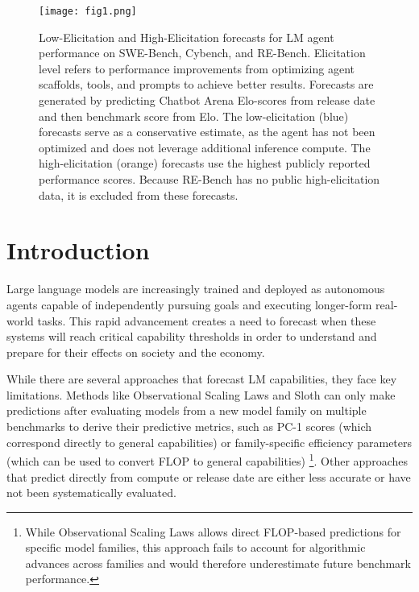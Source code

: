 \begin{figure*}
    \centering
    \texttt{[image: fig1.png]}
    \vskip -0.1in
    \caption{Low-Elicitation and High-Elicitation forecasts for LM agent performance on SWE-Bench, Cybench, and RE-Bench. Elicitation level refers to performance improvements from optimizing agent scaffolds, tools, and prompts to achieve better results. Forecasts are generated by predicting Chatbot Arena Elo-scores from release date and then benchmark score from Elo. The low-elicitation (blue) forecasts serve as a conservative estimate, as the agent has not been optimized and does not leverage additional inference compute. 
    The high-elicitation (orange) forecasts use the highest publicly reported performance scores. Because RE-Bench has no public high-elicitation data, it is excluded from these forecasts.
    } 
    \label{fig:scaling-graph}
\end{figure*}

\section{Introduction}
Large language models are increasingly trained and deployed as autonomous agents capable of independently pursuing goals and executing longer-form real-world tasks. This rapid advancement creates a need to forecast when these systems will reach critical capability thresholds in order to understand and prepare for their effects on society and the economy.

While there are several approaches that forecast LM capabilities, they face key limitations. Methods like Observational Scaling Laws \citep{ruan2024observational} and Sloth \citep{polo2024sloth} can only make predictions after evaluating models from a new model family on multiple benchmarks to derive their predictive metrics, such as PC-1 scores (which correspond directly to general capabilities) \citep{ruan2024observational} or family-specific efficiency parameters (which can be used to convert FLOP to general capabilities) \citep{polo2024sloth}\footnote{While Observational Scaling Laws \citet{ruan2024observational} allows direct FLOP-based predictions for specific model families, this approach fails to account for algorithmic advances across families and would therefore underestimate future benchmark performance.}. Other approaches that predict directly from compute \citep{owen2024predictablelanguagemodelbenchmark} or release date are either less accurate \citep{ruan2024observational} or have not been systematically evaluated. 


